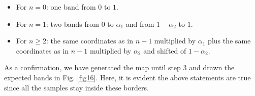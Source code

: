 \documentclass[11pt,titlepage]{article}
\begin{document}
\begin{itemize}
	\item For $n=0$: one band from $0$ to $1$.
	\item For $n=1$: two bands from $0$ to $\alpha_1$ and from $1-\alpha_2$ to $1$.
	\item For $n\ge 2$: the same coordinates as in $n-1$ multiplied by $\alpha_1$ plus the same coordinates as in $n-1$ multiplied by $\alpha_2$ and shifted of $1-\alpha_2$.
\end{itemize}
As a confirmation, we have generated the map until step $3$ and drawn the expected bands in Fig. \ref{fig16}. Here, it is evident the above statements are true since all the samples stay inside these borders. \\

\begin{center}
	\begin{figure} [h]
		\centering
		\hspace{8mm}
		\\
		\centering

\end{figure}
\end{center}
\end{document}
